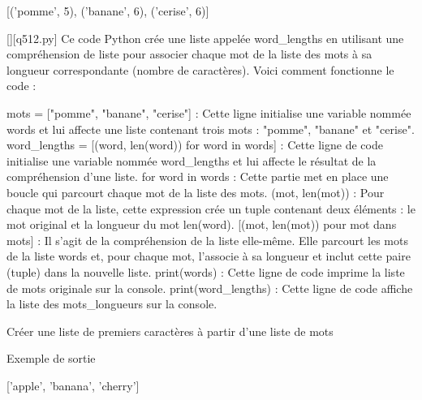 [('pomme', 5), ('banane', 6), ('cerise', 6)]
        \par
        \begin{solution}
            \renewcommand{\nomfichier}{q512.py}
            \pythonfile{\chemincode \nomfichier}[][\nomfichier]
            Ce code Python crée une liste appelée word\_lengths en utilisant une compréhension de liste pour associer chaque mot de la liste des mots à sa longueur correspondante (nombre de caractères). Voici comment fonctionne le code :

    mots = ["pomme", "banane", "cerise"] : Cette ligne initialise une variable nommée words et lui affecte une liste contenant trois mots : "pomme", "banane" et "cerise".
    word\_lengths = [(word, len(word)) for word in words] : Cette ligne de code initialise une variable nommée word\_lengths et lui affecte le résultat de la compréhension d'une liste.
        for word in words : Cette partie met en place une boucle qui parcourt chaque mot de la liste des mots.
        (mot, len(mot)) : Pour chaque mot de la liste, cette expression crée un tuple contenant deux éléments : le mot original et la longueur du mot len(word).
        [(mot, len(mot)) pour mot dans mots] : Il s'agit de la compréhension de la liste elle-même. Elle parcourt les mots de la liste words et, pour chaque mot, l'associe à sa longueur et inclut cette paire (tuple) dans la nouvelle liste.
    print(words) : Cette ligne de code imprime la liste de mots originale sur la console.
    print(word\_lengths) : Cette ligne de code affiche la liste des mots\_longueurs sur la console.
        \end{solution}
        

        \question
        Créer une liste de premiers caractères à partir d'une liste de mots

Exemple de sortie

['apple', 'banana', 'cherry']

